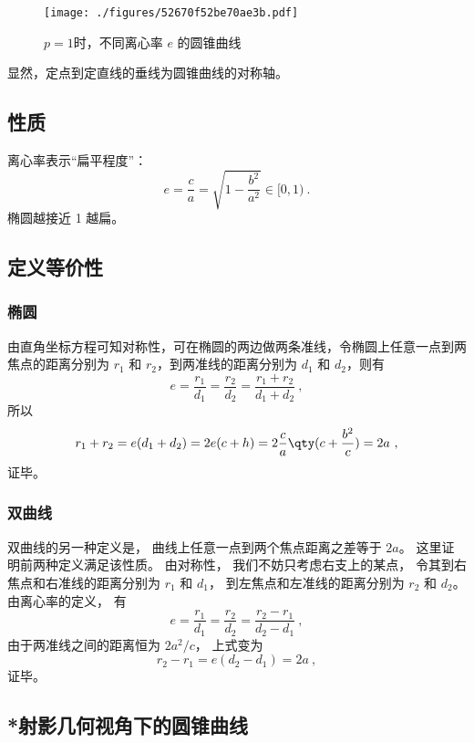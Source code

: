 \begin{figure}[ht]
\centering
\texttt{[image: ./figures/52670f52be70ae3b.pdf]}
\caption{$p = 1$时，不同离心率 $e$ 的圆锥曲线} \label{fig_Cone_2}
\end{figure}

显然，定点到定直线的垂线为圆锥曲线的对称轴。


\subsection{性质}

离心率表示“扁平程度”：
$$ e = \frac{c}{a} = \sqrt{1 - \frac{b^2}{a^2}} \in [0, 1) ~.$$
椭圆越接近 1 越扁。

\subsection{定义等价性}

\subsubsection{椭圆}

由直角坐标方程可知对称性，可在椭圆的两边做两条准线，令椭圆上任意一点到两焦点的距离分别为 $r_1$ 和 $r_2$，到两准线的距离分别为 $d_1$ 和 $d_2$，则有
\begin{equation}
e = \frac{r_1}{d_1} = \frac{r_2}{d_2} = \frac{r_1 + r_2}{d_1 + d_2}~,
\end{equation}
所以
\begin{equation}
r_1 + r_2 = e(d_1+d_2) = 2e(c + h) = 2\frac{c}{a} \qty( c + \frac{b^2}{c} ) = 2a~,
\end{equation}
证毕。
\subsubsection{双曲线}
双曲线的另一种定义是， 曲线上任意一点到两个焦点距离之差等于 $2a$。 这里证明前两种定义满足该性质。 由对称性， 我们不妨只考虑右支上的某点， 令其到右焦点和右准线的距离分别为 $r_1$ 和 $d_1$， 到左焦点和左准线的距离分别为 $r_2$ 和 $d_2$。 由离心率的定义， 有
\begin{equation}
e = \frac{r_1}{d_1} = \frac{r_2}{d_2} = \frac{r_2 - r_1}{d_2 - d_1}~,
\end{equation}
由于两准线之间的距离恒为 $2a^2/c$， 上式变为
\begin{equation}
r_2 - r_1 = e(d_2 - d_1) = 2a~,
\end{equation}
证毕。

\subsection{*射影几何视角下的圆锥曲线}\label{sub_HsCsFD_1}


